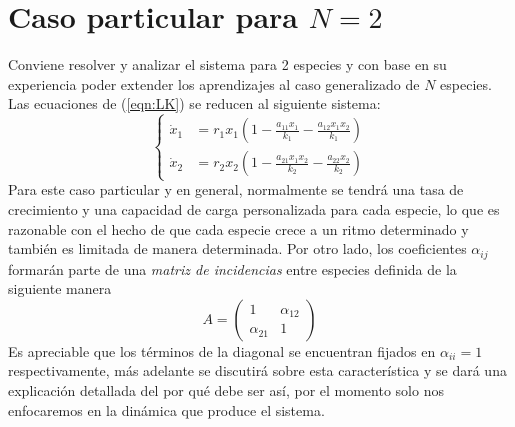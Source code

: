 \section{Caso particular para $N=2$}

Conviene resolver y analizar el sistema para 2 especies y con base en su experiencia poder extender los aprendizajes al caso generalizado de $N$ especies. Las ecuaciones de (\ref{eqn:LK}) se reducen al siguiente sistema:
$$
\begin{cases}
	\dot{x}_1&=r_1x_1\left (1-\frac{a_{11}x_1}{k_1}-\frac{a_{12}x_1x_2}{k_1}\right )\\
	\dot{x}_2&=r_2x_2\left (1-\frac{a_{21}x_1x_2}{k_2}-\frac{a_{22}x_2}{k_2}\right )
\end{cases}
$$
Para este caso particular y en general, normalmente se tendrá una tasa de crecimiento y una capacidad de carga personalizada para cada especie, lo que es razonable con el hecho de que cada especie crece a un ritmo determinado y también es limitada de manera determinada. Por otro lado, los coeficientes $\alpha_{ij}$ formarán parte de una \textit{matriz de incidencias} entre especies definida de la siguiente manera
\begin{equation}\label{eqn:mIncidencias}
	A=
	\begin{pmatrix}
		1 & \alpha_{12}\\
		\alpha_{21} &1
	\end{pmatrix}
\end{equation}
Es apreciable que los términos de la diagonal se encuentran fijados en $\alpha_{ii} = 1$ respectivamente, más adelante se discutirá sobre esta característica y se dará una explicación detallada del por qué debe ser así, por el momento solo nos enfocaremos en la dinámica que produce el sistema. 

